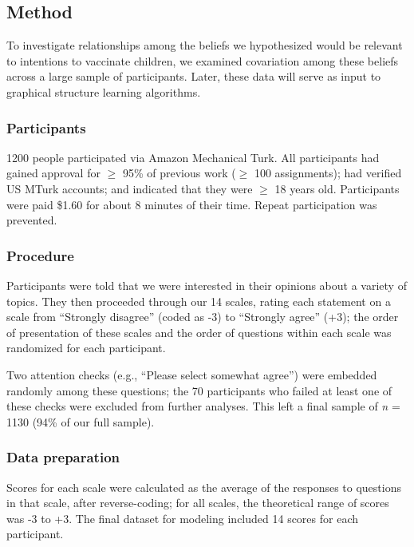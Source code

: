 \documentclass[10pt, letterpaper]{article}
\begin{document}
\subsection{Method}\label{method}

To investigate relationships among the beliefs we hypothesized would be
relevant to intentions to vaccinate children, we examined covariation
among these beliefs across a large sample of participants. Later, these
data will serve as input to graphical structure learning algorithms.

\subsubsection{Participants}\label{participants}

1200 people participated via Amazon Mechanical Turk. All participants
had gained approval for \(\geq\) 95\% of previous work (\(\geq\) 100
assignments); had verified US MTurk accounts; and indicated that they
were \(\geq\) 18 years old. Participants were paid \$1.60 for about 8
minutes of their time. Repeat participation was prevented.

\subsubsection{Procedure}\label{procedure}

Participants were told that we were interested in their opinions about a
variety of topics. They then proceeded through our 14 scales, rating
each statement on a scale from ``Strongly disagree'' (coded as -3) to
``Strongly agree'' (+3); the order of presentation of these scales and
the order of questions within each scale was randomized for each
participant.

Two attention checks (e.g., ``Please select somewhat agree'') were
embedded randomly among these questions; the 70 participants who failed
at least one of these checks were excluded from further analyses. This
left a final sample of \emph{n} = 1130 (94\% of our full sample).

\subsubsection{Data preparation}\label{data-preparation}

Scores for each scale were calculated as the average of the responses to
questions in that scale, after reverse-coding; for all scales, the
theoretical range of scores was -3 to +3. The final dataset for modeling
included 14 scores for each participant.
\end{document}

